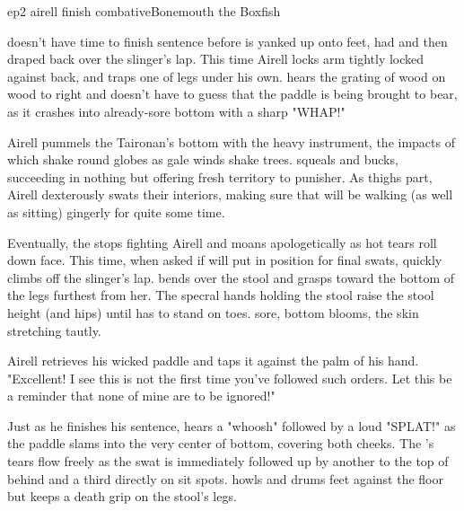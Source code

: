 \documentclass{book}
\begin{document}
\begin{childnode}{ep2 airell finish combative}{Bonemouth the Boxfish}

    \name{} doesn't have time to finish \hisher{} sentence before \heshe{} is yanked up onto \hisher{} feet, had \hisher{}  and then
        draped back over the slinger's lap. This time Airell locks \names{} arm tightly locked against \hisher{} back, and traps one of \names{} legs under his own. \name{} hears the grating of wood on 
        wood to \hisher{} right and doesn't have to guess that the paddle is being brought to bear, as it crashes into \hisher{} already-sore bottom with a sharp "WHAP!"

        Airell pummels the Taironan's bottom with the heavy instrument, the impacts of which shake \hisher{} round globes as gale winds shake trees. \name{} squeals and bucks, succeeding in nothing 
        but offering fresh territory to \hisher{} punisher. As \hisher{} thighs part, Airell dexterously swats their interiors, making sure that \name{} will be walking (as well as sitting) gingerly 
        for quite some time. 

        Eventually, the \boygirl{} stops fighting Airell and moans apologetically as hot tears roll down \hisher{} face. This time, when asked if \heshe{} will put \himselfherself{} in position for 
        \hisher{} final swats, \heshe{} quickly climbs off the slinger's lap. \HeShe{} bends over the stool and grasps toward the bottom of the legs furthest from her. The specral hands holding the
        stool raise the stool height (and \names{} hips) until \name{} has to stand on \hisher{} toes. \names{} sore, \bumadj{} bottom blooms, the skin stretching tautly. 

Airell retrieves his wicked paddle and taps it against the palm of his hand. "Excellent! I see this is not the first time you've followed such orders. Let this be a reminder that none of mine are to 
be ignored!" 

Just as he finishes his sentence, \name{} hears a "whoosh" followed by a loud "SPLAT!" as the paddle slams into the very center of \hisher{} bottom, covering both cheeks. The \boygirl{}'s tears flow 
freely as the swat is immediately followed up by another to the top of \hisher{} behind and a third directly on \hisher{} sit spots. \name{} howls and drums \hisher{} feet against the floor but 
keeps a death grip on the stool's legs. 


\end{childnode}
\end{document}

